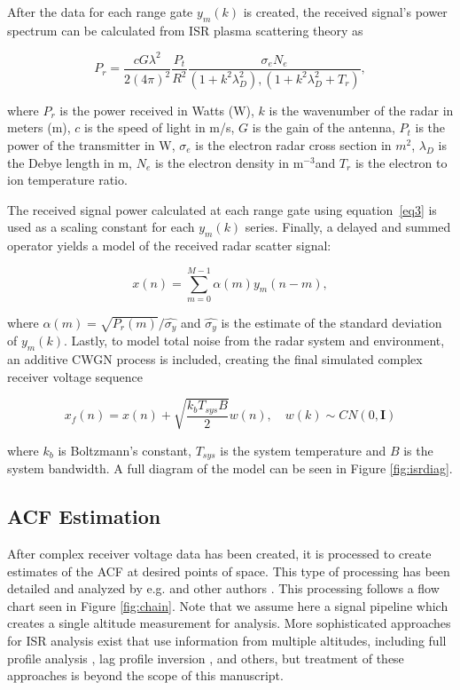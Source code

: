 \documentclass[draft,ras]{agutex}
\begin{document}
\begin{article}
After the data for each range gate $y_m(k)$ is created, the received signal's power spectrum can be calculated from ISR plasma scattering theory as 

\begin{equation}
\label{eq3}
P_r = \frac{cG \lambda^2}{2(4\pi)^2}\frac{P_t }{R^2}\frac{\sigma_e N_e}{(1+k^2\lambda_D^2),(1+k^2\lambda_D^2 + T_r)},
\end{equation}
 
 \noindent where $P_r$ is the power received in Watts (W), $k$ is the wavenumber of the radar in meters (m), $c$ is the speed of light in m/s, $G$ is the gain of the antenna, $P_t$ is the power of the transmitter in W, $\sigma_e$ is the electron radar cross section in $m^2$,  $\lambda_D$ is the Debye length in m, $N_e$ is the electron density in m$^{-3}$and $T_r$ is the electron to ion temperature ratio.
  
The received signal power calculated at each range gate using equation~\ref{eq3} is used as a scaling constant for each $y_m(k)$ series.  Finally, a delayed and summed operator yields a model of the received radar scatter signal:
 
\begin{equation}
\label{eq4}
x(n) = \displaystyle\sum\limits_{m =0}^{M-1} \alpha(m)y_m(n-m),
\end{equation}

\noindent where $\alpha(m) = \sqrt{P_r(m)}/\widehat{\sigma_y}$ and $\widehat{\sigma_y}$ is the estimate of the standard deviation of $y_m(k)$. Lastly, to model total noise from the radar system and environment, an additive CWGN process is included, creating the final simulated complex receiver voltage sequence

\begin{equation}
\label{eq:addnoise}
x_f(n) = x(n) +\sqrt{\frac{k_bT_{sys}B}{2}} w(n), \quad w(k)\sim CN(0,\mathbf{I})
\end{equation}

\noindent where $k_b$ is Boltzmann's constant, $T_{sys}$ is the system temperature and $B$ is the system bandwidth.
A full diagram of the model can be seen in Figure \ref{fig:isrdiag}.


\subsection{ACF Estimation}

After complex receiver voltage data has been created, it is processed to create estimates of the ACF at desired points of space. This type of processing has been detailed and analyzed by e.g. \citet{farley1969} and other authors \citep{nygren1996}. This processing follows a flow chart seen in Figure \ref{fig:chain}.  Note that we assume here a signal pipeline which creates a single altitude measurement for analysis.  More sophisticated approaches for ISR analysis exist that use information from multiple altitudes, including full profile analysis \citep{RDS:RDS3308}, lag profile inversion \citep{Virtanen:20082vx}, and others, but treatment of these approaches is beyond the scope of this manuscript.


\end{article}
\end{document}

